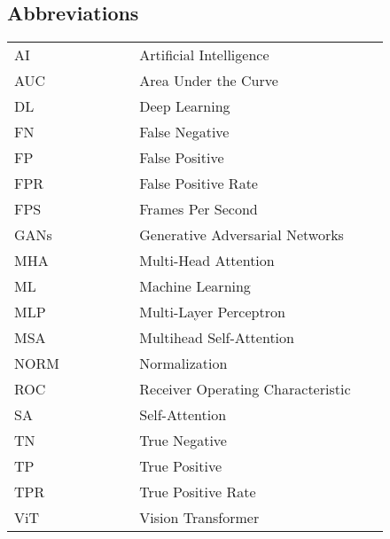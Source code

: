 \begin{center}
    \section*{Abbreviations}
    \begin{table}[h]
        \centering
        \renewcommand{\arraystretch}{1.5}
        \begin{tabular}{@{}p{0.3\linewidth}p{0.6\linewidth}@{}}
            AI    & Artificial Intelligence                             \\
            AUC   & Area Under the Curve                                \\
            DL    & Deep Learning                                       \\
            FN    & False Negative                                      \\
            FP    & False Positive                                      \\
            FPR   & False Positive Rate                                 \\
            FPS   & Frames Per Second                                   \\
            GANs  & Generative Adversarial Networks                     \\
            MHA   & Multi-Head Attention                                \\
            ML    & Machine Learning                                    \\
            MLP   & Multi-Layer Perceptron                              \\
            MSA   & Multihead Self-Attention                            \\
            NORM  & Normalization                                       \\
            ROC   & Receiver Operating Characteristic                   \\
            SA    & Self-Attention                                      \\
            TN    & True Negative                                       \\
            TP    & True Positive                                       \\
            TPR   & True Positive Rate                                  \\
            ViT   & Vision Transformer                                  \\
        \end{tabular}
    \end{table}
\end{center}
